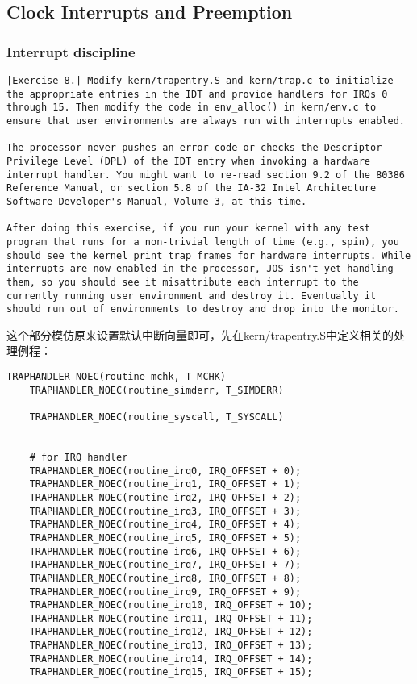 \documentclass{article}
\begin{document}
\begin{CJK*}{UTF8}{gkai}
\subsection{Clock Interrupts and Preemption}

\subsubsection{Interrupt discipline}


\begin{lstlisting}[style=exercise]
|Exercise 8.| Modify kern/trapentry.S and kern/trap.c to initialize the appropriate entries in the IDT and provide handlers for IRQs 0 through 15. Then modify the code in env_alloc() in kern/env.c to ensure that user environments are always run with interrupts enabled.

The processor never pushes an error code or checks the Descriptor Privilege Level (DPL) of the IDT entry when invoking a hardware interrupt handler. You might want to re-read section 9.2 of the 80386 Reference Manual, or section 5.8 of the IA-32 Intel Architecture Software Developer's Manual, Volume 3, at this time.

After doing this exercise, if you run your kernel with any test program that runs for a non-trivial length of time (e.g., spin), you should see the kernel print trap frames for hardware interrupts. While interrupts are now enabled in the processor, JOS isn't yet handling them, so you should see it misattribute each interrupt to the currently running user environment and destroy it. Eventually it should run out of environments to destroy and drop into the monitor.
\end{lstlisting}

这个部分模仿原来设置默认中断向量即可，先在kern/trapentry.S中定义相关的处理例程：

\begin{lstlisting}[style=acode, title={\scriptsize \ttfamily \bfseries kern/trapentry.S}]
    TRAPHANDLER_NOEC(routine_mchk, T_MCHK)
    TRAPHANDLER_NOEC(routine_simderr, T_SIMDERR)

    TRAPHANDLER_NOEC(routine_syscall, T_SYSCALL)


    # for IRQ handler
    TRAPHANDLER_NOEC(routine_irq0, IRQ_OFFSET + 0);
    TRAPHANDLER_NOEC(routine_irq1, IRQ_OFFSET + 1);
    TRAPHANDLER_NOEC(routine_irq2, IRQ_OFFSET + 2);
    TRAPHANDLER_NOEC(routine_irq3, IRQ_OFFSET + 3);
    TRAPHANDLER_NOEC(routine_irq4, IRQ_OFFSET + 4);
    TRAPHANDLER_NOEC(routine_irq5, IRQ_OFFSET + 5);
    TRAPHANDLER_NOEC(routine_irq6, IRQ_OFFSET + 6);
    TRAPHANDLER_NOEC(routine_irq7, IRQ_OFFSET + 7);
    TRAPHANDLER_NOEC(routine_irq8, IRQ_OFFSET + 8);
    TRAPHANDLER_NOEC(routine_irq9, IRQ_OFFSET + 9);
    TRAPHANDLER_NOEC(routine_irq10, IRQ_OFFSET + 10);
    TRAPHANDLER_NOEC(routine_irq11, IRQ_OFFSET + 11);
    TRAPHANDLER_NOEC(routine_irq12, IRQ_OFFSET + 12);
    TRAPHANDLER_NOEC(routine_irq13, IRQ_OFFSET + 13);
    TRAPHANDLER_NOEC(routine_irq14, IRQ_OFFSET + 14);
    TRAPHANDLER_NOEC(routine_irq15, IRQ_OFFSET + 15);


\end{lstlisting}
\end{CJK*}
\end{document}
